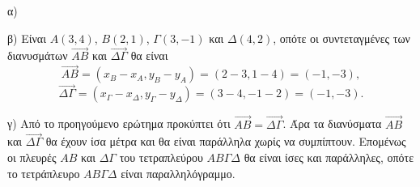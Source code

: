 
α)

β) Είναι $A(3,4)$, $B(2,1)$, $\Gamma(3,-1)$ και $\Delta(4,2)$, οπότε οι συντεταγμένες των διανυσμάτων $\overrightarrow{AB}$ και $\overrightarrow{\Delta\Gamma}$ θα είναι
\[ \overrightarrow{AB} = (x_B - x_A , y_B - y_A) = (2 - 3, 1 - 4) = (-1, -3), \]
\[ \overrightarrow{\Delta\Gamma} = (x_\Gamma - x_\Delta , y_\Gamma - y_\Delta) = (3 - 4, -1 - 2) = (-1, -3). \]

γ) Από το προηγούμενο ερώτημα προκύπτει ότι $\overrightarrow{AB} = \overrightarrow{\Delta\Gamma}$. Άρα τα διανύσματα $\overrightarrow{AB}$ και $\overrightarrow{\Delta\Gamma}$ θα έχουν ίσα μέτρα και θα είναι παράλληλα χωρίς να συμπίπτουν. Επομένως οι πλευρές $AB$ και $\Delta\Gamma$ του τετραπλεύρου $AB\Gamma\Delta$ θα είναι ίσες και παράλληλες, οπότε το τετράπλευρο $AB\Gamma\Delta$ είναι παραλληλόγραμμο.